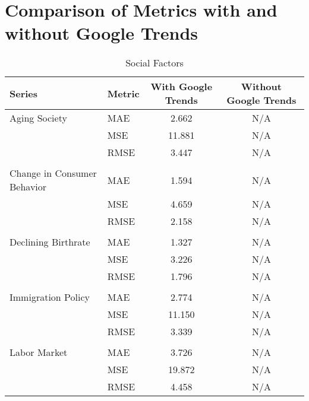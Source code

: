 \documentclass[a4paper,12pt]{article}
\begin{document}
\section*{Comparison of Metrics with and without Google Trends}

\begin{table}
\caption{Social Factors}
\label{tab:metrics_comparison_Social_Factors}
\begin{tabular}{llcc}
\toprule
Series & Metric & With Google Trends & Without Google Trends \\
\midrule
Aging Society & MAE & 2.662 & N/A \\
 & MSE & 11.881 & N/A \\
 & RMSE & 3.447 & N/A \\
\arrayrulecolor{black!30}\midrule &  &  &  \\
Change in Consumer Behavior & MAE & 1.594 & N/A \\
 & MSE & 4.659 & N/A \\
 & RMSE & 2.158 & N/A \\
\arrayrulecolor{black!30}\midrule &  &  &  \\
Declining Birthrate & MAE & 1.327 & N/A \\
 & MSE & 3.226 & N/A \\
 & RMSE & 1.796 & N/A \\
\arrayrulecolor{black!30}\midrule &  &  &  \\
Immigration Policy & MAE & 2.774 & N/A \\
 & MSE & 11.150 & N/A \\
 & RMSE & 3.339 & N/A \\
\arrayrulecolor{black!30}\midrule &  &  &  \\
Labor Market & MAE & 3.726 & N/A \\
 & MSE & 19.872 & N/A \\
 & RMSE & 4.458 & N/A \\
\bottomrule
\end{tabular}
\end{table}
\end{document}
